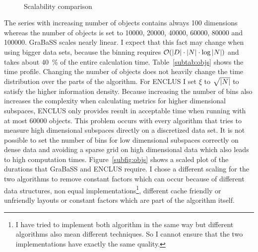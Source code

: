 \begin{figure}
	\caption{Scalability comparison}
	\label{fig:scale}
	 \\
\end{figure}

The series with increasing number of objects contains always \num{100} dimensions whereas the number of objects is set to \num{10000}, \num{20000}, \num{40000}, \num{60000}, \num{80000} and \num{100000}. GraBaSS scales nearly linear. I expect that this fact may change when using bigger data sets, because the binning requires $\mathcal{O} (\left|D\right| \cdot \left|N\right| \cdot \log{\left|N\right|})$ and takes about \SI{40}{\percent} of the entire calculation time. Table~\ref{subtab:objs} shows the time profile. Changing the number of objects does not heavily change the time distribution over the parts of the algorithm. For ENCLUS I set $\xi$ to $\sqrt{\left|N\right|}$ to satisfy the higher information density. Because increasing the number of bins also increases the complexity when calculating metrics for higher dimensional subspaces, ENCLUS only provides result in acceptable time when running with at most \num{60000} objects. This problem occurs with every algorithm that tries to measure high dimensional subspaces directly on a discretized data set. It is not possible to set the number of bins for low dimensional subspaces correctly on dense data and avoiding a sparse grid on high dimensional data which also leads to high computation times. Figure~\ref{subfig:objs} shows a scaled plot of the durations that GraBaSS and ENCLUS require. I chose a different scaling for the two algorithms to remove constant factors which can occur because of different data structures, non equal implementations\footnote{I have tried to implement both algorithm in the same way but different algorithms also mean different techniques. So I cannot ensure that the two implementations have exactly the same quality.}, different cache friendly or unfriendly layouts or constant factors which are part of the algorithm itself.

